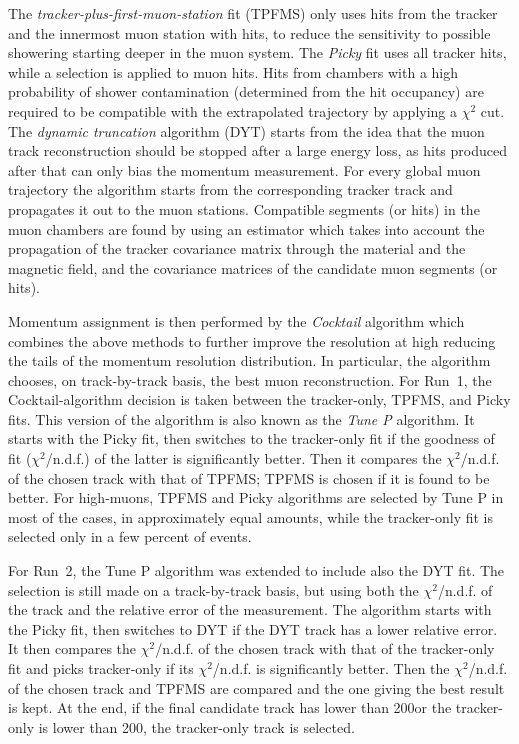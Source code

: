 The \textit{tracker-plus-first-muon-station} fit (TPFMS) only uses hits from the tracker and the innermost muon station with hits, to reduce the sensitivity to possible showering starting deeper in the muon system. The \textit{Picky} fit uses all tracker hits, while a selection is applied to muon hits. Hits from chambers with a high probability of shower contamination (determined from the hit occupancy) are required to be compatible with the extrapolated trajectory by applying a $\chi^2$ cut. The \textit{dynamic truncation} algorithm (DYT) starts from the idea that the muon track reconstruction should be stopped after a large energy loss, as hits produced after that can only bias the momentum measurement. For every global muon trajectory the algorithm starts from the corresponding tracker track and propagates it out to the muon stations. Compatible segments (or hits) in the muon chambers are found by using an estimator which takes into account the propagation of the tracker covariance matrix through the material and the magnetic field, and the covariance matrices of the candidate muon segments (or hits).

Momentum assignment is then performed by the \textit{Cocktail} algorithm which combines the above methods to further improve the resolution at high \pt reducing the tails of the momentum resolution distribution.
In particular, the algorithm chooses, on track-by-track basis, the best muon reconstruction. For Run~1, the Cocktail-algorithm decision is taken between the tracker-only, TPFMS, and Picky fits. 
This version of the algorithm is also known as the \textit{Tune P} algorithm. It starts with the Picky fit, then switches to the tracker-only fit if the goodness of fit ($\chi^2$/n.d.f.) of the latter is significantly better. Then it compares the $\chi^2$/n.d.f. of the chosen track with that of TPFMS; TPFMS is chosen if it is found to be better. For high-\pt muons, TPFMS and Picky algorithms are selected by Tune P in most of the cases, in approximately equal amounts, while the tracker-only fit is selected only in a few percent of events. 

For Run~2, the Tune P algorithm was extended to include also the DYT fit. The selection is still made on a track-by-track basis, but using both the $\chi^2$/n.d.f. of the track and the relative error of the \pt measurement. The algorithm starts with the Picky fit, then switches to DYT if the DYT track has a lower relative \pt error. It then compares the $\chi^2$/n.d.f. of the chosen track with that of the tracker-only fit and picks tracker-only if its $\chi^2$/n.d.f. is significantly better. Then the $\chi^2$/n.d.f. of the chosen track and TPFMS are compared and the one giving the best result is kept. At the end, if the final candidate track has \pt lower than 200\GeV or the tracker-only \pt is lower than 200\GeV, the tracker-only track is selected.%

